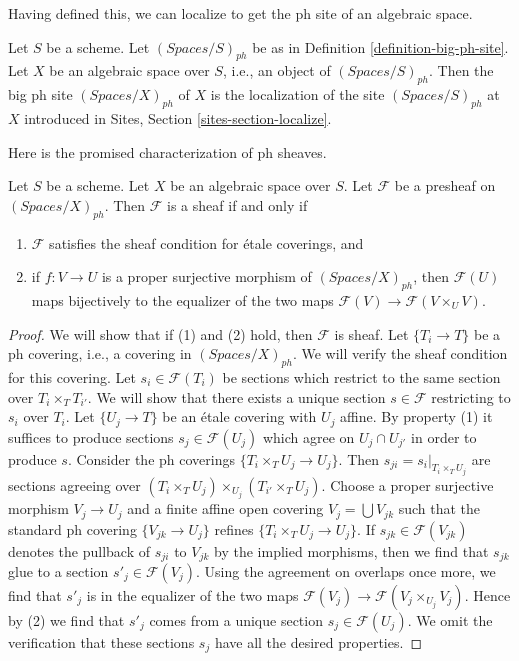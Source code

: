 \noindent
Having defined this, we can localize to get the ph
site of an algebraic space.

\begin{definition}
\label{definition-big-small-ph}
Let $S$ be a scheme. Let $(\textit{Spaces}/S)_{ph}$ be as in
Definition \ref{definition-big-ph-site}.
Let $X$ be an algebraic space over $S$, i.e., an object of
$(\textit{Spaces}/S)_{ph}$. Then the big ph site
{\it $(\textit{Spaces}/X)_{ph}$} of $X$
is the localization of the site $(\textit{Spaces}/S)_{ph}$
at $X$ introduced in Sites, Section \ref{sites-section-localize}.
\end{definition}

\noindent
Here is the promised characterization of ph sheaves.

\begin{lemma}
\label{lemma-characterize-sheaf}
Let $S$ be a scheme. Let $X$ be an algebraic space over $S$.
Let $\mathcal{F}$ be a presheaf on $(\textit{Spaces}/X)_{ph}$.
Then $\mathcal{F}$ is a sheaf if and only if
\begin{enumerate}
\item $\mathcal{F}$ satisfies the sheaf condition for \'etale coverings, and
\item if $f : V \to U$ is a proper surjective morphism of
$(\textit{Spaces}/X)_{ph}$, then
$\mathcal{F}(U)$ maps bijectively to the equalizer
of the two maps $\mathcal{F}(V) \to \mathcal{F}(V \times_U V)$.
\end{enumerate}
\end{lemma}

\begin{proof}
We will show that if (1) and (2) hold, then $\mathcal{F}$ is sheaf.
Let $\{T_i \to T\}$ be a ph covering, i.e., a covering in
$(\textit{Spaces}/X)_{ph}$.
We will verify the sheaf condition for this covering.
Let $s_i \in \mathcal{F}(T_i)$ be sections which restrict to the same
section over $T_i \times_T T_{i'}$. We will show that there exists a
unique section $s \in \mathcal{F}$ restricting to $s_i$ over $T_i$.
Let $\{U_j \to T\}$ be an \'etale covering with $U_j$ affine.
By property (1) it suffices to produce sections $s_j \in \mathcal{F}(U_j)$
which agree on $U_j \cap U_{j'}$ in order to produce $s$.
Consider the ph coverings $\{T_i \times_T U_j \to U_j\}$.
Then $s_{ji} = s_i|_{T_i \times_T U_j}$ are sections agreeing
over $(T_i \times_T U_j) \times_{U_j} (T_{i'} \times_T U_j)$.
Choose a proper surjective morphism $V_j \to U_j$ and a finite affine
open covering $V_j = \bigcup V_{jk}$ such that the standard ph covering
$\{V_{jk} \to U_j\}$ refines $\{T_i \times_T U_j \to U_j\}$.
If $s_{jk} \in \mathcal{F}(V_{jk})$
denotes the pullback of $s_{ji}$ to $V_{jk}$ by the
implied morphisms, then we find that $s_{jk}$ glue to a section
$s'_j \in \mathcal{F}(V_j)$. Using the agreement on overlaps
once more, we find that $s'_j$ is in the equalizer of the two
maps $\mathcal{F}(V_j) \to \mathcal{F}(V_j \times_{U_j} V_j)$.
Hence by (2) we find that $s'_j$ comes from a unique section
$s_j \in \mathcal{F}(U_j)$. We omit the verification that these
sections $s_j$ have all the desired properties.
\end{proof}

